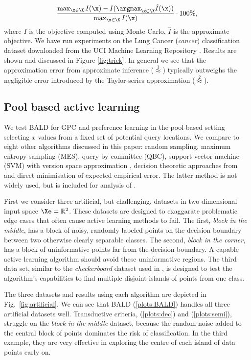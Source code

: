 \begin{align}
	\frac{ \max_{\x\in\X} I(\x) - I(\argmax_{\x\in\X}\hat{I}(\x)) }{{\max_{\x\in\X}I(\x) }}\cdot 100\%,
\end{align}
where $I$ is the objective computed using Monte Carlo, $\hat{I}$ is the approximate objective. We have run experiments on the Lung Cancer (\emph{cancer}) classification dataset \citep{Hong1991} downloaded from the UCI Machine Learning Repository \citep{UCIRepository}. Results are shown and discussed in Figure \ref{fig:trick}. In general we see that the approximation error from approximate inference ({\scriptsize $\stackrel{1}{\approx}$}) typically outweighs the negligible error introduced by the Taylor-series approximation ({\scriptsize $\stackrel{2}{\approx}$}).

\subsection{Pool based active learning}

We test BALD for GPC and preference learning in the pool-based setting \ie selecting $x$ values from a fixed set of potential query locations. We compare to eight other algorithms discussed in this paper: random sampling, maximum entropy sampling (MES), query by committee (QBC), support vector machine (SVM) with version space approximation \cite{tong2001}, decision theoretic approaches from \citep{Kapoor2007, Zhu2003} and direct minimisation of expected empirical error. The latter method is not widely used, but is included for analysis of \cite{Kapoor2007}.

First we consider three artificial, but challenging, datasets in two dimensional input space $\Xe = \mathbb{R}^2$. These datasets are designed to exaggarate problematic edge cases that often cause active learning methods to fail. The first, \emph{block in the middle}, has a block of noisy, randomly labeled points on the decision boundary between two otherwise clearly separable classes. The second, \emph{block in the corner}, has a block of uninformative points far from the decision boundary. A capable active learning algorithm should avoid these uninformative regions. The third data set, similar to the \emph{checkerboard} dataset used in \cite{Zhu2003}, is designed to test the algorithm's capabilities to find multiple disjoint islands of points from one class. 

The three datasets and results using each algorithm are depicted in Fig.\ \ref{fig:artificial}. We can see that BALD (\ref{plots:BALD}) handles all three artificial datasets well. Transductive criteria, \citet{Kapoor2007} (\ref{plots:dec}) and \citet{Zhu2003} (\ref{plots:semi}), struggle on the \emph{block in the middle} dataset, because the random noise added to the central block of points dominates the risk of classification. In the third example, they are very effective in exploring the centre of each island of data points early on.

